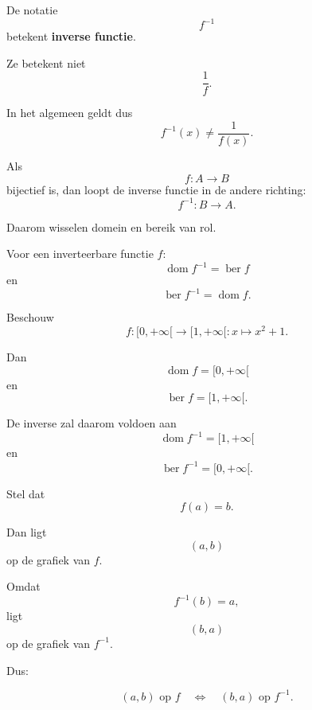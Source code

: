 \documentclass{ximera}
\begin{document}
\begin{opmerking}
De notatie
\[
f^{-1}
\]
betekent \textbf{inverse functie}.

Ze betekent niet
\[
\frac{1}{f}.
\]

In het algemeen geldt dus
\[
\boxed{f^{-1}(x)\neq\frac{1}{f(x)}.}
\]
\end{opmerking}



Als
\[
f:A\to B
\]
bijectief is, dan loopt de inverse functie in de andere richting:
\[
f^{-1}:B\to A.
\]

Daarom wisselen domein en bereik van rol.

\begin{eigenschap}
Voor een inverteerbare functie \(f\):
\[
\boxed{\operatorname{dom}f^{-1}=\operatorname{ber}f}
\]
en
\[
\boxed{\operatorname{ber}f^{-1}=\operatorname{dom}f.}
\]
\end{eigenschap}

\begin{voorbeeld}
Beschouw
\[
f:[0,+\infty[\to[1,+\infty[:x\mapsto x^2+1.
\]

Dan
\[
\operatorname{dom}f=[0,+\infty[
\]
en
\[
\operatorname{ber}f=[1,+\infty[.
\]

De inverse zal daarom voldoen aan
\[
\operatorname{dom}f^{-1}=[1,+\infty[
\]
en
\[
\operatorname{ber}f^{-1}=[0,+\infty[.
\]
\end{voorbeeld}



Stel dat
\[
f(a)=b.
\]

Dan ligt
\[
(a,b)
\]
op de grafiek van \(f\).

Omdat
\[
f^{-1}(b)=a,
\]
ligt
\[
(b,a)
\]
op de grafiek van \(f^{-1}\).

Dus:

\[
\boxed{(a,b)\text{ op }f\quad\Longleftrightarrow\quad(b,a)\text{ op }f^{-1}.}
\]
\end{document}
